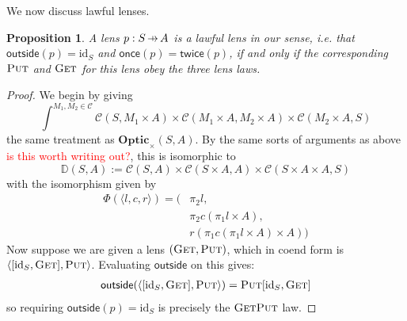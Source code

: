 \documentclass[11pt,a4paper]{article}
\theoremstyle{plain}
\newtheorem{proposition}[theorem]{Proposition}
\theoremstyle{definition}
\newcommand{\C}{\mathscr{C}}
\newcommand{\Optic}{\mathbf{Optic}}
\newcommand{\id}{\mathrm{id}}
\newcommand{\fget}{\textsc{Get}}
\newcommand{\fput}{\textsc{Put}}
\newcommand{\outside}{\mathsf{outside}}
\newcommand{\once}{\mathsf{once}}
\newcommand{\twice}{\mathsf{twice}}
\newcommand{\hto}{\ensuremath{\,\mathaccent\shortmid\rightarrow\,}}
\newcommand{\todo}[1]{\textcolor{red}{\small #1}}
\begin{document}
We now discuss lawful lenses.

\begin{proposition}
\label{prop-OpticImpliesLensLaws}
A lens $p : S \hto A$ is a lawful lens in our sense, i.e. that $\outside(p) = \id_S$ and $\once(p) = \twice(p)$, if and only if the corresponding $\fput$ and $\fget$ for this lens obey the three lens laws.
\end{proposition}
\begin{proof}
We begin by giving
\[ \int^{M_1, M_2 \in \C} \C(S, M_1 \times A) \times \C(M_1 \times A, M_2 \times A) \times \C(M_2 \times A, S)\]
the same treatment as $\Optic_\times(S, A)$. By the same sorts of arguments as above \todo{is this worth writing out?}, this is isomorphic to
\[\mathbb{D}(S, A) := \C(S, A) \times \C(S \times A, A) \times \C(S \times A \times A, S)\]
with the isomorphism given by 
\begin{align*}
\Phi(\langle l, c, r \rangle) = (&\pi_2 l, \\
&\pi_2 c (\pi_1 l \times A), \\
&r(\pi_1 c (\pi_1 l \times A) \times A))
\end{align*}
Now suppose we are given a lens $(\fget, \fput)$, which in coend form is $\langle [\id_S, \fget],  \fput \rangle$. Evaluating $\outside$ on this gives:
\begin{align*}
\outside(\langle [\id_S, \fget],  \fput \rangle) = \fput [\id_S, \fget]
\end{align*}
so requiring $\outside(p) = \id_S$ is precisely the $\fget\fput$ law.


\end{proof}
\end{document}
